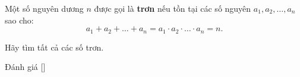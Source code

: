 \ifshowproblem
\begin{problem}\label{problem:GER-2015-MO-P2}
    Một số nguyên dương \( n \) được gọi là \textbf{trơn} nếu tồn tại các số nguyên \( a_1, a_2, \dots, a_n \) sao cho:
    \[
        a_1 + a_2 + \dots + a_n = a_1 \cdot a_2 \cdot \dots \cdot a_n = n.
    \]
    
    Hãy tìm tất cả các số trơn.
\end{problem}
\fi

\ifshowinfo
Đánh giá [\textbf{}]\footnotemark
{}
\fi